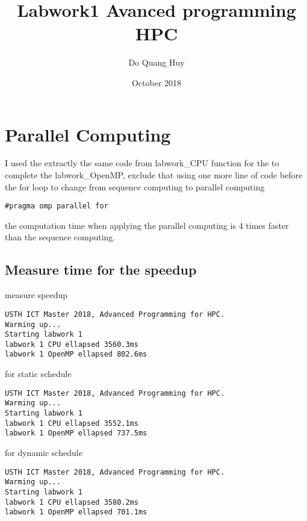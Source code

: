 \documentclass{article}
\title{Labwork1 Avanced programming HPC}
\author{Do Quang Huy}
\date{October 2018}
\begin{document}
\maketitle

\section{Parallel Computing}
I used the extractly the same code from labwork\_CPU function for the to complete the labwork\_OpenMP, exclude that using one more line of code before the for loop to change from sequence computing to parallel computing 

\begin{verbatim}
#pragma omp parallel for
\end{verbatim}

the computation time when applying the parallel computing is 4 times faster than the sequence computing.  

\subsection{Measure time for the speedup}
measure speedup
\begin{verbatim}
USTH ICT Master 2018, Advanced Programming for HPC.
Warming up...
Starting labwork 1
labwork 1 CPU ellapsed 3560.3ms
labwork 1 OpenMP ellapsed 802.6ms
\end{verbatim}


for static schedule
\begin{verbatim}
USTH ICT Master 2018, Advanced Programming for HPC.
Warming up...
Starting labwork 1
labwork 1 CPU ellapsed 3552.1ms
labwork 1 OpenMP ellapsed 737.5ms
\end{verbatim}

for dynamic schedule
\begin{verbatim}
USTH ICT Master 2018, Advanced Programming for HPC.
Warming up...
Starting labwork 1
labwork 1 CPU ellapsed 3580.2ms
labwork 1 OpenMP ellapsed 701.1ms
\end{verbatim}
\end{document}
